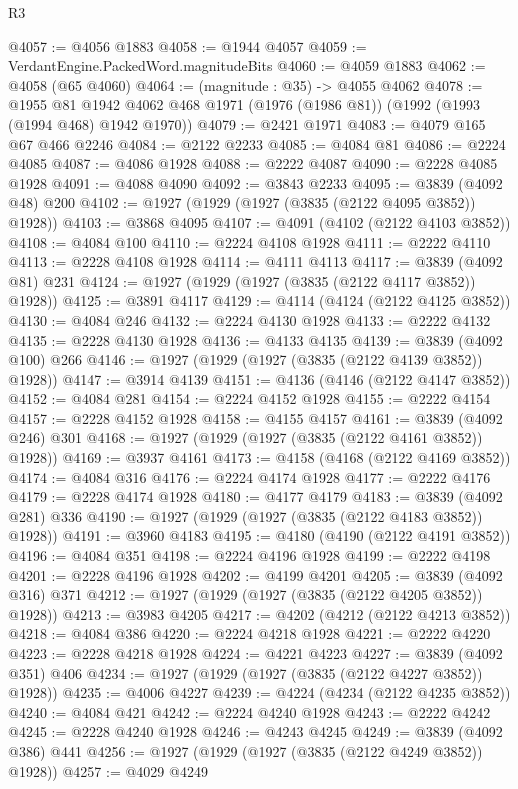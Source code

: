 \begin{lexlean}{R3}
\begin{coremodule}
@4057 := @4056 @1883
@4058 := @1944 @4057
@4059 := VerdantEngine.PackedWord.magnitudeBits
@4060 := @4059 @1883
@4062 := @4058 (@65 @4060)
@4064 := (magnitude : @35) -> @4055 @4062
@4078 := @1955
    @81
    @1942
    @4062
    @468
    @1971
    (@1976 (@1986 @81))
    (@1992 (@1993 (@1994 @468) @1942 @1970))
@4079 := @2421 @1971
@4083 := @4079 @165 @67 @466 @2246
@4084 := @2122 @2233
@4085 := @4084 @81
@4086 := @2224 @4085
@4087 := @4086 @1928
@4088 := @2222 @4087
@4090 := @2228 @4085 @1928
@4091 := @4088 @4090
@4092 := @3843 @2233
@4095 := @3839 (@4092 @48) @200
@4102 := @1927 (@1929 (@1927 (@3835 (@2122 @4095 @3852)) @1928))
@4103 := @3868 @4095
@4107 := @4091 (@4102 (@2122 @4103 @3852))
@4108 := @4084 @100
@4110 := @2224 @4108 @1928
@4111 := @2222 @4110
@4113 := @2228 @4108 @1928
@4114 := @4111 @4113
@4117 := @3839 (@4092 @81) @231
@4124 := @1927 (@1929 (@1927 (@3835 (@2122 @4117 @3852)) @1928))
@4125 := @3891 @4117
@4129 := @4114 (@4124 (@2122 @4125 @3852))
@4130 := @4084 @246
@4132 := @2224 @4130 @1928
@4133 := @2222 @4132
@4135 := @2228 @4130 @1928
@4136 := @4133 @4135
@4139 := @3839 (@4092 @100) @266
@4146 := @1927 (@1929 (@1927 (@3835 (@2122 @4139 @3852)) @1928))
@4147 := @3914 @4139
@4151 := @4136 (@4146 (@2122 @4147 @3852))
@4152 := @4084 @281
@4154 := @2224 @4152 @1928
@4155 := @2222 @4154
@4157 := @2228 @4152 @1928
@4158 := @4155 @4157
@4161 := @3839 (@4092 @246) @301
@4168 := @1927 (@1929 (@1927 (@3835 (@2122 @4161 @3852)) @1928))
@4169 := @3937 @4161
@4173 := @4158 (@4168 (@2122 @4169 @3852))
@4174 := @4084 @316
@4176 := @2224 @4174 @1928
@4177 := @2222 @4176
@4179 := @2228 @4174 @1928
@4180 := @4177 @4179
@4183 := @3839 (@4092 @281) @336
@4190 := @1927 (@1929 (@1927 (@3835 (@2122 @4183 @3852)) @1928))
@4191 := @3960 @4183
@4195 := @4180 (@4190 (@2122 @4191 @3852))
@4196 := @4084 @351
@4198 := @2224 @4196 @1928
@4199 := @2222 @4198
@4201 := @2228 @4196 @1928
@4202 := @4199 @4201
@4205 := @3839 (@4092 @316) @371
@4212 := @1927 (@1929 (@1927 (@3835 (@2122 @4205 @3852)) @1928))
@4213 := @3983 @4205
@4217 := @4202 (@4212 (@2122 @4213 @3852))
@4218 := @4084 @386
@4220 := @2224 @4218 @1928
@4221 := @2222 @4220
@4223 := @2228 @4218 @1928
@4224 := @4221 @4223
@4227 := @3839 (@4092 @351) @406
@4234 := @1927 (@1929 (@1927 (@3835 (@2122 @4227 @3852)) @1928))
@4235 := @4006 @4227
@4239 := @4224 (@4234 (@2122 @4235 @3852))
@4240 := @4084 @421
@4242 := @2224 @4240 @1928
@4243 := @2222 @4242
@4245 := @2228 @4240 @1928
@4246 := @4243 @4245
@4249 := @3839 (@4092 @386) @441
@4256 := @1927 (@1929 (@1927 (@3835 (@2122 @4249 @3852)) @1928))
@4257 := @4029 @4249

\end{coremodule}
\end{lexlean}

